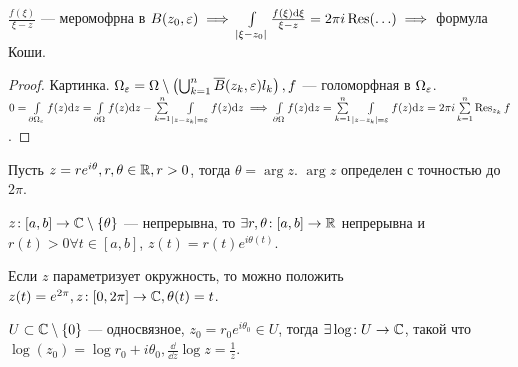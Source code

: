 \begin{remark}
    $\frac{f(\xi)}{\xi - z}$ --- меромофрна в $B(z_0, \varepsilon) \implies \int\limits_{\left| \xi - z_0 \right| } \frac{f(\xi) \mathrm{d}\xi}{\xi - z} = 2\pi i \operatorname{Res}(\ldots) \implies$ формула Коши.
\end{remark}
\begin{proof}
    Картинка.
    $\Omega_\varepsilon = \Omega \setminus \left( \bigcup_{k=1}^n \overline{B}(z_k, \varepsilon) l_k \right), f$ --- голоморфная в $\Omega_\varepsilon$.  $0 = \int\limits_{\partial \Omega_\varepsilon} f(z) \mathrm{d}z = \int\limits_{\partial \Omega} f(z) \mathrm{d}z - \sum\limits_{k=1}^n \int\limits_{|z-z_k| = \varepsilon} f(z) \mathrm{d}z \implies \int\limits_{\partial \Omega} f(z) \mathrm{d}z = \sum\limits_{k=1}^n \int\limits_{\left| z - z_k \right| = \varepsilon} f(z) \mathrm{d}z = 2 \pi i \sum\limits_{k=1}^n \operatorname{Res}_{z_k} f$.
\end{proof}
Пусть $z = r e^{i\theta}, r, \theta \in \mathbb{R}, r > 0$, тогда $\theta = \arg z$. $\arg z$ определен с точностью до  $2\pi$.
\begin{remark}
    $z\!:[a, b] \to \mathbb{C} \setminus \left\{ \theta \right\}$ --- непрерывна, то $\exists r, \theta\!: [a, b] \to \mathbb{R}$ непрерывна и  $r(t) > 0 \forall t \in [a, b]$,  $z(t) = r(t) e^{i\theta(t)}$.
\end{remark}
\begin{example}
    Если $z$ параметризует окружность, то можно положить  $z(t) = e^{2 \pi}, z\!: [0, 2\pi] \to \mathbb{C}, \theta(t) = t$.
\end{example}
$U \subset \mathbb{C} \setminus \left\{ 0 \right\}$ --- односвязное, $z_0 = r_0 e^{i \theta_0} \in U$, тогда $\exists \log\!: U \to \mathbb{C}$, такой что  $\log(z_0) = \log r_0 + i\theta_0, \frac{\dd{}}{\dd{z}} \log z = \frac{1}{z}$.

